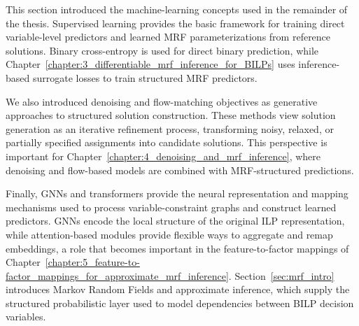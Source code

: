 This section introduced the machine-learning concepts used in the remainder of the thesis. Supervised learning provides the basic framework for training direct variable-level predictors and learned MRF parameterizations from reference solutions. Binary cross-entropy is used for direct binary prediction, while Chapter~\ref{chapter:3_differentiable_mrf_inference_for_BILPs} uses inference-based surrogate losses to train structured MRF predictors.

We also introduced denoising and flow-matching objectives as generative approaches to structured solution construction. These methods view solution generation as an iterative refinement process, transforming noisy, relaxed, or partially specified assignments into candidate solutions. This perspective is important for Chapter~\ref{chapter:4_denoising_and_mrf_inference}, where denoising and flow-based models are combined with MRF-structured predictions.

Finally, GNNs and transformers provide the neural representation and mapping mechanisms used to process variable-constraint graphs and construct learned predictors. GNNs encode the local structure of the original ILP representation, while attention-based modules provide flexible ways to aggregate and remap embeddings, a role that becomes important in the feature-to-factor mappings of Chapter~\ref{chapter:5_feature-to-factor_mappings_for_approximate_mrf_inference}. Section~\ref{sec:mrf_intro} introduces Markov Random Fields and approximate inference, which supply the structured probabilistic layer used to model dependencies between BILP decision variables.